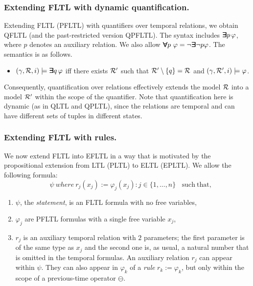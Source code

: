\subsubsection{Extending FLTL with dynamic quantification.}




Extending FLTL (PFLTL) with quantifiers over temporal relations, we obtain QFLTL
(and the past-restricted version QPFLTL). 
The syntax includes $\bm{\exists}\kern-0.6em\bm{\exists} p \, \varphi$, 
where $p$ denotes an auxiliary relation.
We also allow $\bm{\forall}\kern-0.6em\bm{\forall} p\ \varphi = \neg \bm{\exists}\kern-0.6em\bm{\exists} \neg p \varphi$. The semantics is as follows. %




\begin{itemize}
\item $(\gamma ,  {\cal R}, i) \models \bm{\exists}\kern-0.6em\bm{\exists} q \, \varphi$ iff there exists
${\cal R}'$ such that ${\cal R}' \setminus {\{ q \} } = {\cal R}$ and 
$( \gamma, {\cal R}' , i) \models \varphi$.
\end{itemize}
Consequently, quantification over relations effectively extends the model ${\cal R}$ into a model ${\cal R}'$ within the scope of the quantifier. Note that quantification here is dynamic (as in QLTL and QPLTL), since the relations are temporal and can have different sets of tuples in different states.

\subsubsection{Extending FLTL  with rules.}

We now extend FLTL into EFLTL in a way that is motivated by the  propositional extension from LTL (PLTL) to ELTL (EPLTL). We allow the following formula:
\begin{equation}
\label{EFLTL}
\ \ \ \ \ \psi \mathit{\ where\ } r_j  ( x_j ) := 
\varphi_j (x_j) : j \in \{ 1 , \ldots , n \} \mathrm{\ \ \ \     such\ that,}
\end{equation}
\begin{enumerate}
\item $\psi$, the {\em statement}, is an FLTL formula with
no free variables, 
\item $\varphi_j$ are PFLTL formulas with a single
free variable $x_j$,
\item $r_j$ is an auxiliary temporal relation with $2$ parameters; the first parameter is of the same 
type as $x_j$ and the second one is, as usual,
a natural number that is omitted in the temporal formulas. 
An auxiliary relation $r_j$ can appear within $\psi$. They can also appear in $\varphi_k$ of a {\em rule} $r_k := \varphi_k$, but only within the
scope
of a previous-time operator $\ominus$. 
\end{enumerate}

